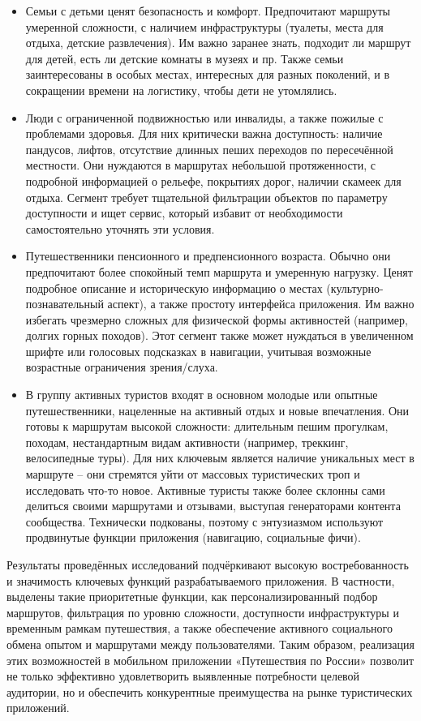 \begin{itemize}
    \item 	Семьи с детьми ценят безопасность и комфорт. Предпочитают маршруты умеренной сложности, с наличием инфраструктуры (туалеты, места для отдыха, детские развлечения). Им важно заранее знать, подходит ли маршрут для детей, есть ли детские комнаты в музеях и пр. Также семьи заинтересованы в особых местах, интересных для разных поколений, и в сокращении времени на логистику, чтобы дети не утомлялись.
    \item 	Люди с ограниченной подвижностью или инвалиды, а также пожилые с проблемами здоровья. Для них критически важна доступность: наличие пандусов, лифтов, отсутствие длинных пеших переходов по пересечённой местности. Они нуждаются в маршрутах небольшой протяженности, с подробной информацией о рельефе, покрытиях дорог, наличии скамеек для отдыха. Сегмент требует тщательной фильтрации объектов по параметру доступности и ищет сервис, который избавит от необходимости самостоятельно уточнять эти условия.
    \item 	Путешественники пенсионного и предпенсионного возраста. Обычно они предпочитают более спокойный темп маршрута и умеренную нагрузку. Ценят подробное описание и историческую информацию о местах (культурно-познавательный аспект), а также простоту интерфейса приложения. Им важно избегать чрезмерно сложных для физической формы активностей (например, долгих горных походов). Этот сегмент также может нуждаться в увеличенном шрифте или голосовых подсказках в навигации, учитывая возможные возрастные ограничения зрения/слуха.
    \item 	В группу активных туристов входят в основном молодые или опытные путешественники, нацеленные на активный отдых и новые впечатления. Они готовы к маршрутам высокой сложности: длительным пешим прогулкам, походам, нестандартным видам активности (например, треккинг, велосипедные туры). Для них ключевым является наличие уникальных мест в маршруте – они стремятся уйти от массовых туристических троп и исследовать что-то новое. Активные туристы также более склонны сами делиться своими маршрутами и отзывами, выступая генераторами контента сообщества. Технически подкованы, поэтому с энтузиазмом используют продвинутые функции приложения (навигацию, социальные фичи).
\end{itemize}

\noindent Результаты проведённых исследований подчёркивают высокую востребованность и значимость ключевых функций разрабатываемого приложения. В частности, выделены такие приоритетные функции, как персонализированный подбор маршрутов, фильтрация по уровню сложности, доступности инфраструктуры и временным рамкам путешествия, а также обеспечение активного социального обмена опытом и маршрутами между пользователями. Таким образом, реализация этих возможностей в мобильном приложении «Путешествия по России» позволит не только эффективно удовлетворить выявленные потребности целевой аудитории, но и обеспечить конкурентные преимущества на рынке туристических приложений.

